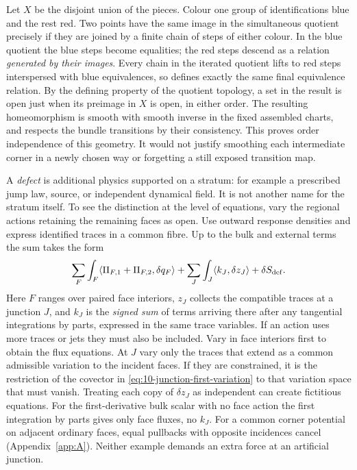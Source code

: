 Let $X$ be the disjoint union of the pieces. Colour one group of identifications blue and the rest red. Two points have the same image in the simultaneous quotient precisely if they are joined by a finite chain of steps of either colour. In the blue quotient the blue steps become equalities; the red steps descend as a relation \emph{generated by their images}. Every chain in the iterated quotient lifts to red steps interspersed with blue equivalences, so defines exactly the same final equivalence relation. By the defining property of the quotient topology, a set in the result is open just when its preimage in $X$ is open, in either order. The resulting homeomorphism is smooth with smooth inverse in the fixed assembled charts, and respects the bundle transitions by their consistency. This proves order independence of this geometry. It would not justify smoothing each intermediate corner in a newly chosen way or forgetting a still exposed transition map.

A \emph{defect} is additional physics supported on a stratum: for example a prescribed jump law, source, or independent dynamical field. It is not another name for the stratum itself. To see the distinction at the level of equations, vary the regional actions retaining the remaining faces as open. Use outward response densities and express identified traces in a common fibre. Up to the bulk and external terms the sum takes the form
\begin{equation}
 \sum_F\int_F\langle\Pi_{F,1}+\Pi_{F,2},\delta q_F\rangle
 +\sum_J\int_J\langle k_J,\delta z_J\rangle+\delta S_{\rm def} .
 \label{eq:10-junction-first-variation}
\end{equation}
Here $F$ ranges over paired face interiors, $z_J$ collects the compatible traces at a junction $J$, and $k_J$ is the \emph{signed sum} of terms arriving there after any tangential integrations by parts, expressed in the same trace variables. If an action uses more traces or jets they must also be included. Vary in face interiors first to obtain the flux equations. At $J$ vary only the traces that extend as a common admissible variation to the incident faces. If they are constrained, it is the restriction of the covector in \eqref{eq:10-junction-first-variation} to that variation space that must vanish. Treating each copy of $\delta z_J$ as independent can create fictitious equations. For the first-derivative bulk scalar with no face action the first integration by parts gives only face fluxes, no $k_J$. For a common corner potential on adjacent ordinary faces, equal pullbacks with opposite incidences cancel (Appendix~\ref{app:A}). Neither example demands an extra force at an artificial junction.

